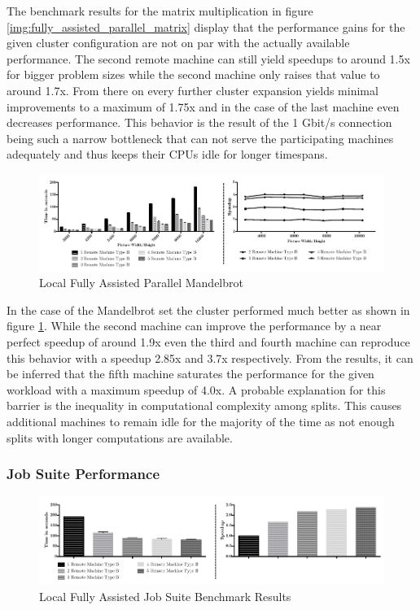 The benchmark results for the matrix multiplication in figure \ref{img:fully_assisted_parallel_matrix} display that the performance gains for the given cluster configuration are not on par with the actually available performance. The second remote machine can still yield speedups to around 1.5x for bigger problem sizes while the second machine only raises that value to around 1.7x. From there on every further cluster expansion yields minimal improvements to a maximum of 1.75x and in the case of the last machine even decreases performance. This behavior is the result of the 1 Gbit/s connection being such a narrow bottleneck that can not serve the participating machines adequately and thus keeps their CPUs idle for longer timespans.

\begin{figure}[!htb]

	\includegraphics[width=1.0\textwidth]{images/local_fully_assisted_mandelbrot.pdf}
	\centering
	\caption{Local Fully Assisted Parallel Mandelbrot}
	\label{img:fully_assisted_parallel_mandelbrot}
\end{figure}

In the case of the Mandelbrot set the cluster performed much better as shown in figure \ref{img:fully_assisted_parallel_mandelbrot}. While the second machine can improve the performance by a near perfect speedup of around 1.9x even the third and fourth machine can reproduce this behavior with a speedup 2.85x and 3.7x respectively. From the results, it can be inferred that the fifth machine saturates the performance for the given workload with a maximum speedup of 4.0x. A probable explanation for this barrier is the inequality in computational complexity among splits. This causes additional machines to remain idle for the majority of the time as not enough splits with longer computations are available.

\subsubsection*{Job Suite Performance}

\begin{figure}[!htb]

	\includegraphics[width=1.0\textwidth]{images/local_fully_assisted_full_benchmark.pdf}
	\centering
	\caption{Local Fully Assisted Job Suite Benchmark Results}
	\label{img:local_fully_assisted_benchmark_results}
\end{figure}

